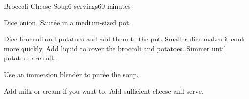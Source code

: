 \documentclass[../Cookbook.tex]{subfiles}
\begin{document}
\begin{recipe}{Broccoli Cheese Soup}{6 servings}{60 minutes}

	Dice onion. Saut\'ee in a medium-sized pot.

	Dice broccoli and potatoes and add them to the pot. Smaller dice makes it cook more quickly.
	Add liquid to cover the broccoli and potatoes. Simmer until potatoes are soft.

	\newstep
	Use an immersion blender 
	to pur\'ee the soup.

	Add milk or cream if you want to. Add sufficient cheese and serve.


\end{recipe}
\end{document}
